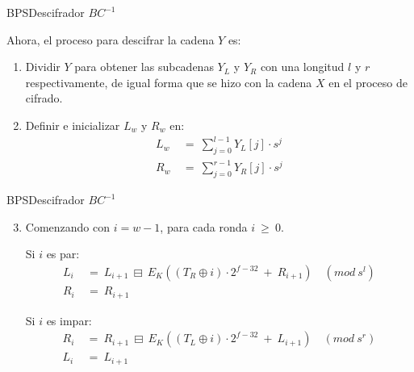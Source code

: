 \begin{frame}{BPS}{Descifrador $BC^{-1}$}

  Ahora, el proceso para descifrar la cadena $Y$ es:

  \begin{enumerate}
    \item Dividir $Y$ para obtener las subcadenas $Y_L$ y $Y_R$ con una
      longitud $l$ y $r$ respectivamente, de igual forma que se hizo con
      la cadena $X$ en el proceso de cifrado.

    \item Definir e inicializar $L_w$ y $R_w$ en:
      \begin{align*}
        L_w\: &=\: \sum_{j=0}^{l-1} Y_L[j] \cdot s^j \\
        R_w\: &=\: \sum_{j=0}^{r-1} Y_R[j] \cdot s^j
      \end{align*}
  \end{enumerate}
\end{frame}

\begin{frame}{BPS}{Descifrador $BC^{-1}$}

  \begin{enumerate}
    \setcounter{enumi}{2}
    \item Comenzando con $i=w-1$, para cada ronda $i\: \geq\: 0$.

    Si $i$ es par:
    \begin{align*}
      L_i\: &=\: L_{i+1}\: \boxminus\:
                E_K((T_R \oplus i) \cdot 2^{f-32}\: +\: R_{i+1})\quad
                (mod\ s^l) \\
      R_i\: &=\: R_{i+1}
    \end{align*}

    Si $i$ es impar:
    \begin{align*}
      R_i\: &=\: R_{i+1}\: \boxminus\:
                E_K((T_L \oplus i) \cdot 2^{f-32}\: +\: L_{i+1})\quad
                (mod\ s^r) \\
      L_i\: &=\: L_{i+1}
    \end{align*}

  \end{enumerate}
\end{frame}

